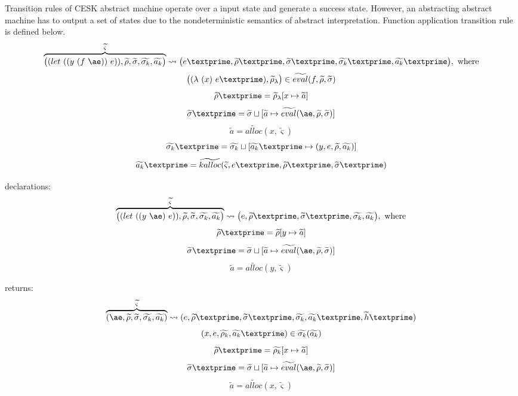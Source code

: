 \documentclass{article}
\begin{document}
Transition rules of CESK abstract machine operate over a input state and generate a success state.
However, an abstracting abstract machine has to output a set of states due to the nondeterministic semantics of abstract interpretation.
Function application transition rule is defined below.
\[
\overbrace{
\big((let\ ((y\ (f\ \ae))\ e)), \widetilde{\rho}, \widetilde{\sigma}, \widetilde{\sigma_k}, \widetilde{a_k} \big)
}^{\widetilde{\varsigma}}
\leadsto \big(e\textprime,\widetilde{\rho}\textprime, \widetilde{\sigma}\textprime, \widetilde{\sigma_k}\textprime, \widetilde{a_k}\textprime \big), \mbox{ where}
\]
\[
\big((\lambda\ (x)\ e\textprime), \widetilde{\rho}_{\lambda}  \big) \in \widetilde{eval}(f, \widetilde{\rho}, \widetilde{\sigma})
\]
\[
\widetilde{\rho}\textprime = \widetilde{\rho}_{\lambda}[x \mapsto \widetilde{a}]
\]
\[
\widetilde{\sigma}\textprime = \widetilde{\sigma} \sqcup [\widetilde{a} \mapsto \widetilde{eval}(\ae, \widetilde{\rho}, \widetilde{\sigma})]
\]
\[
\widetilde{a} = \widetilde{alloc}(x, \widetilde{\varsigma})
\]
\[
\widetilde{\sigma_k}\textprime = \widetilde{\sigma_k} \sqcup [\widetilde{a_k}\textprime \mapsto {(y, e, \widetilde{\rho}, \widetilde{a_k})}]
\]
\[
\widetilde{a_k}\textprime = \widetilde{kalloc}(\widetilde{\varsigma}, e\textprime, \widetilde{\rho}\textprime, \widetilde{\sigma}\textprime)
\]

declarations:
\[
\overbrace{
\big((let\ ((y\ \ae)\ e)), \widetilde{\rho}, \widetilde{\sigma}, \widetilde{\sigma_k}, \widetilde{a_k} \big)
}^{\widetilde{\varsigma}}
\leadsto \big(e,\widetilde{\rho}\textprime, \widetilde{\sigma}\textprime, \widetilde{\sigma_k}, \widetilde{a_k} \big), \mbox{ where}
\]
\[
\widetilde{\rho}\textprime = \widetilde{\rho}[y \mapsto \widetilde{a}]
\]
\[
\widetilde{\sigma}\textprime = \widetilde{\sigma} \sqcup [\widetilde{a} \mapsto \widetilde{eval}(\ae, \widetilde{\rho}, \widetilde{\sigma})]
\]
\[
\widetilde{a} = \widetilde{alloc}(y, \widetilde{\varsigma})
\]


returns:
\[
\overbrace{
(\ae, \widetilde{\rho}, \widetilde{\sigma}, \widetilde{\sigma_k}, \widetilde{a_k})
}^{\widetilde{\varsigma}}
\leadsto (e, \widetilde{\rho}\textprime, \widetilde{\sigma}\textprime, \widetilde{\sigma_k}, \widetilde{a_k}\textprime, \widetilde{h}\textprime)
\]
\[
(x, e, \widetilde{\rho_k}, \widetilde{a_k}\textprime) \in \widetilde{\sigma_k}(\widetilde{a_k})
\]
\[
\widetilde{\rho}\textprime = \widetilde{\rho_k}[x \mapsto \widetilde{a}]
\]
\[
\widetilde{\sigma}\textprime = \widetilde{\sigma} \sqcup [\widetilde{a} \mapsto \widetilde{eval}(\ae, \widetilde{\rho}, \widetilde{\sigma})]
\]
\[
\widetilde{a} = \widetilde{alloc}(x, \widetilde{\varsigma})
\]
\end{document}

